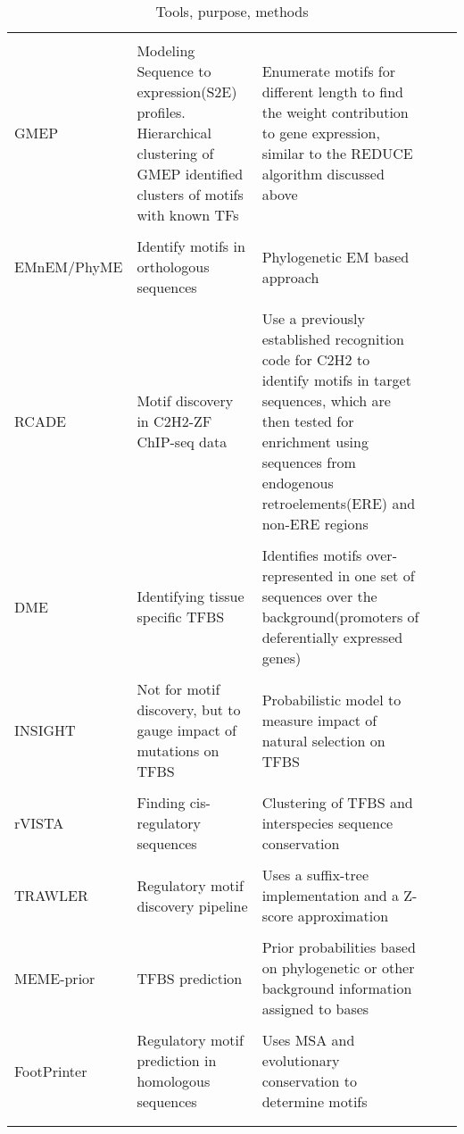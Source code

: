 \documentclass[a4paper,11pt]{article}
\newcommand{\red}[1]{{\color{red!80!orange}#1}}
\newcommand{\cmark}{\ding{51}}%
\newcommand{\xmark}{\ding{55}}%
\begin{document}
\begin{longtable}{ P{3cm} p{4.6cm} p{4.6cm} P{2cm} P{2cm}  }
\hline \\
GMEP & Modeling Sequence to expression(S2E) profiles. Hierarchical clustering of GMEP identified clusters of motifs with known TFs & Enumerate motifs for different length to find the weight contribution to gene expression, similar to the REDUCE algorithm discussed above & \cite{chiang_visualizing_2001} & \xmark \\
\hline \\
\red{EMnEM/PhyME}  & Identify motifs in orthologous sequences & Phylogenetic EM based approach & \cite{sinha_phyme:_2004,moses_phylogenetic_2004} & \xmark\\
\hline \\
RCADE  & Motif discovery in C2H2-ZF ChIP-seq data & Use a previously established recognition code for C2H2 to identify  motifs in target sequences, which are then tested for enrichment using sequences from endogenous retroelements(ERE) and non-ERE regions &  \cite{najafabadi_identification_2015} & \xmark \\
\hline\\
DME & Identifying tissue specific TFBS & Identifies motifs over-represented in one set of sequences over the background(promoters of deferentially expressed genes) & \cite{smith_identifying_2005} & \cmark \\
\hline \\
\red{INSIGHT} & Not for motif discovery, but to gauge impact of mutations on TFBS& Probabilistic model to measure impact of natural selection on TFBS  & \cite{siepel_cis-regulatory_2014} & \xmark \\
\hline\\
\red{rVISTA} & Finding cis-regulatory sequences & Clustering of TFBS and interspecies sequence conservation  & \cite{loots_rvista_2002} & \xmark \\
\hline\\
TRAWLER & Regulatory motif discovery pipeline & Uses a suffix-tree implementation and a Z-score approximation &\cite{ettwiller_trawler:_2007} & \cmark \\
\hline\\
\red{MEME-prior} & TFBS prediction & Prior probabilities based on phylogenetic or other background information assigned to bases & \cite{cuellar-partida_epigenetic_2012} & \cmark \\
\hline\\
\red{FootPrinter} & Regulatory motif prediction in homologous sequences & Uses MSA and evolutionary conservation to determine motifs & \cite{blanchette_footprinter:_2003} & \xmark \\
\hline\\
\caption{Tools, purpose, methods}
\label{tab:table1}
\end{longtable}
\end{document}

